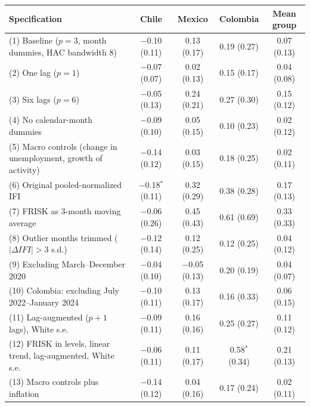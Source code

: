 \begin{tabular}{@{} L{5.5cm} cccc @{}}
\toprule
\textbf{Specification} & \textbf{Chile} & \textbf{Mexico} & \textbf{Colombia} & \textbf{Mean group} \\
\midrule
(1) Baseline ($p=3$, month dummies, HAC bandwidth 8) & $-$0.10 (0.11) & 0.13 (0.17) & 0.19 (0.27) & 0.07 (0.13) \\
\midrule
(2) One lag ($p=1$) & $-$0.07 (0.07) & 0.02 (0.13) & 0.15 (0.17) & 0.04 (0.08) \\
(3) Six lags ($p=6$) & $-$0.05 (0.13) & 0.24 (0.21) & 0.27 (0.30) & 0.15 (0.12) \\
(4) No calendar-month dummies & $-$0.09 (0.10) & 0.05 (0.15) & 0.10 (0.23) & 0.02 (0.12) \\
(5) Macro controls (change in unemployment, growth of activity) & $-$0.14 (0.12) & 0.03 (0.15) & 0.18 (0.25) & 0.02 (0.11) \\
(6) Original pooled-normalized IFI & $-$0.18$^{*}$ (0.11) & 0.32 (0.29) & 0.38 (0.28) & 0.17 (0.13) \\
(7) FRISK as 3-month moving average & $-$0.06 (0.26) & 0.45 (0.43) & 0.61 (0.69) & 0.33 (0.33) \\
(8) Outlier months trimmed ($|\Delta IFI|>3$ s.d.) & $-$0.12 (0.14) & 0.12 (0.25) & 0.12 (0.25) & 0.04 (0.12) \\
(9) Excluding March--December 2020 & $-$0.04 (0.10) & $-$0.05 (0.13) & 0.20 (0.19) & 0.04 (0.07) \\
(10) Colombia: excluding July 2022--January 2024 & $-$0.10 (0.11) & 0.13 (0.17) & 0.16 (0.33) & 0.06 (0.15) \\
(11) Lag-augmented ($p+1$ lags), White s.e. & $-$0.09 (0.11) & 0.16 (0.16) & 0.25 (0.27) & 0.11 (0.12) \\
(12) FRISK in levels, linear trend, lag-augmented, White s.e. & $-$0.06 (0.11) & 0.11 (0.17) & 0.58$^{*}$ (0.34) & 0.21 (0.13) \\
(13) Macro controls plus inflation & $-$0.14 (0.12) & 0.04 (0.16) & 0.17 (0.24) & 0.02 (0.11) \\
\bottomrule
\end{tabular}